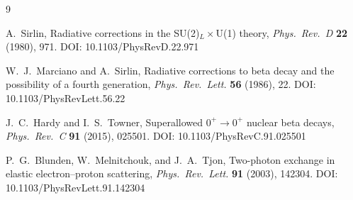 \documentclass[11pt,a4paper]{article}
\begin{document}
\begin{thebibliography}{9}

A.~Sirlin,
Radiative corrections in the SU(2)$_L \times$U(1) theory,
\emph{Phys.\ Rev.\ D} \textbf{22} (1980), 971.
DOI: 10.1103/PhysRevD.22.971

W.~J.~Marciano and A.~Sirlin,
Radiative corrections to beta decay and the possibility of a fourth generation,
\emph{Phys.\ Rev.\ Lett.} \textbf{56} (1986), 22.
DOI: 10.1103/PhysRevLett.56.22

J.~C.~Hardy and I.~S.~Towner,
Superallowed $0^+\!\to0^+$ nuclear beta decays,
\emph{Phys.\ Rev.\ C} \textbf{91} (2015), 025501.
DOI: 10.1103/PhysRevC.91.025501

P.~G.~Blunden, W.~Melnitchouk, and J.~A.~Tjon,
Two-photon exchange in elastic electron--proton scattering,
\emph{Phys.\ Rev.\ Lett.} \textbf{91} (2003), 142304.
DOI: 10.1103/PhysRevLett.91.142304

\end{thebibliography}
\end{document}
